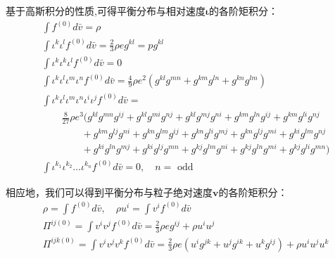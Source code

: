 \documentclass[LBMDerivation.tex]{subfiles}
\begin{document}
基于高斯积分的性质,可得平衡分布与相对速度$\boldsymbol{\iota}$的各阶矩积分：
%
%
\begin{equation}
  \begin{aligned}
     & \int  f^{(0)} d\bar{v}=\rho                                                                                                                                \\
     & \int  \iota^{k} \iota^{l} f^{(0)}d\bar{v} = \frac{2}{3}\rho e g^{k l}  =pg^{k l}                                                                           \\
     & \int  \iota^{k} \iota^{k} \iota^{l} f^{(0)}d\bar{v}  = 0                                                                                                   \\
     & \int  \iota^{k} \iota^{l}  \iota^{m} \iota^{n} f^{(0)}d\bar{v}  =     \frac{4}{9}\rho e^2 (g^{kl}g^{mn}+g^{km}g^{ln}+g^{kn}g^{lm})                         \\
     & \int  \iota^{k} \iota^{l}  \iota^{m} \iota^{n} \iota^{i} \iota^{j} f^{(0)}d\bar{v}  =                                                                      \\
     & \quad\quad  \frac{8}{27}\rho e^3 ( g^{k l} g^{m n} g^{i j}+g^{k l} g^{m i} g^{n j}+g^{k l} g^{m j} g^{n i}+g^{k m} g^{l n} g^{i j}+g^{k m} g^{l i} g^{n j} \\
     & \quad\quad\quad\quad +g^{k m} g^{l j} g^{n i}+g^{k n} g^{l m} g^{i j}+g^{k n} g^{l i} g^{m j}+g^{k n} g^{l j} g^{m i}+g^{k i} g^{l m} g^{n j}              \\
     & \quad\quad\quad\quad +g^{k i} g^{l n} g^{m j}+g^{k i} g^{l j} g^{m n}+g^{k j} g^{l m} g^{n i}+g^{k j} g^{l n} g^{m i}+g^{k j} g^{l i} g^{m n})             \\
     & \int \iota^{k_{1}} \iota^{k_{2}} \ldots \iota^{k_{n}}  f^{(0)}d \bar{v}  =0, \quad n=\text { odd }
  \end{aligned}
  \label{EQUATION::A.19} ~
\end{equation}
%
%

相应地，我们可以得到平衡分布与粒子绝对速度$\boldsymbol{v}$的各阶矩积分：
\begin{equation}
  \begin{aligned}
     & \rho=\int f^{(0)} d \bar{v}, \quad \rho u^{i}=\int  v^{i} f^{(0)} d \bar{v}                                                               \\
     & \Pi^{i j (0)}=\int  v^{i} v^{j} f^{(0)}d \bar{v}= \frac{2}{3}\rho e g^{i j}+\rho u^{i} u^{j}                                              \\
     & \Pi^{i j k (0)}=\int  v^{i} v^{j} v^{k}  f^{(0)} d \bar{v}= \frac{2}{3}\rho e (u^i g^{jk}+u^j g^{ik} + u^k g^{ij})+\rho u^{i} u^{j} u^{k} \\
  \end{aligned}
  \label{EQUATION::A.20} ~
\end{equation}
%
\end{document}
